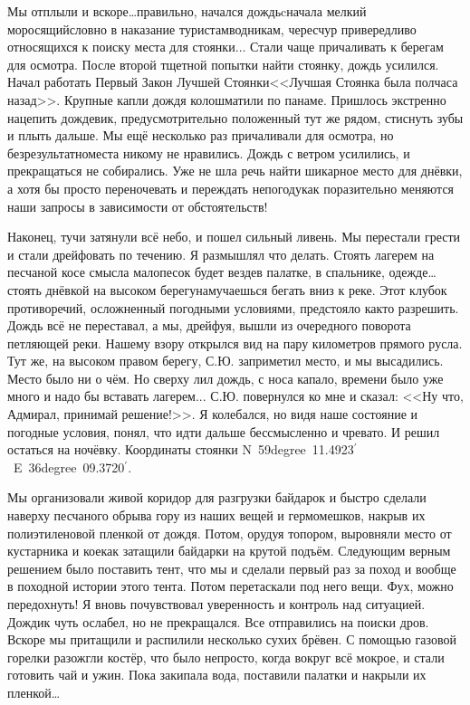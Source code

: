 Мы отплыли и вскоре\ldots  правильно, начался дождь\mdash cначала мелкий моросящий\mdash словно в наказание туристам\sdash водникам, чересчур привередливо относящихся к поиску места для стоянки$\ldots$ Стали чаще причаливать к берегам для осмотра. После второй тщетной попытки найти стоянку, дождь усилился. Начал работать Первый Закон Лучшей Стоянки\mdash <<Лучшая Стоянка была полчаса назад>>. Крупные капли дождя колошматили по панаме. Пришлось экстренно нацепить дождевик, предусмотрительно положенный тут же рядом, стиснуть зубы и плыть дальше. Мы ещё несколько раз причаливали для осмотра, но безрезультатно\mdash места никому не нравились. Дождь с ветром усилились, и прекращаться не собирались. Уже не шла речь найти шикарное место для днёвки, а хотя бы просто переночевать и переждать непогоду\mdash как поразительно меняются наши запросы в зависимости от обстоятельств!

Наконец, тучи затянули всё небо, и пошел сильный ливень. Мы перестали грести и стали дрейфовать по течению. Я размышлял что делать. Стоять лагерем на песчаной косе смысла мало\mdash песок будет везде\mdash в палатке, в спальнике, одежде\ldots  стоять днёвкой на высоком берегу\mdash намучаешься бегать вниз к реке. Этот клубок противоречий, осложненный погодными условиями, предстояло как\sdash то разрешить. Дождь всё не переставал, а мы, дрейфуя, вышли из очередного поворота петляющей реки. Нашему взору открылся вид на пару километров прямого русла. Тут же, на высоком правом берегу, С.Ю. заприметил место, и мы высадились. Место было ни о чём. Но сверху лил дождь, с носа капало, времени было уже много и надо бы вставать лагерем... С.Ю. повернулся ко мне и сказал: <<Ну что, Адмирал, принимай решение!>>. Я колебался, но видя наше состояние и погодные условия, понял, что идти дальше бессмысленно и чревато. И решил остаться на ночёвку. Координаты стоянки N~59degree~11.4923$^\prime$~E~36degree~09.3720$^\prime$.

Мы организовали живой коридор для разгрузки байдарок и быстро сделали наверху песчаного обрыва гору из наших вещей и гермомешков, накрыв их полиэтиленовой пленкой от дождя. Потом, орудуя топором, выровняли место от кустарника и кое\sdash как затащили байдарки на крутой подъём. Следующим верным решением было поставить тент, что мы и сделали первый раз за поход и вообще в походной истории этого тента. Потом перетаскали под него вещи. Фух, можно передохнуть! Я вновь почувствовал уверенность и контроль над ситуацией. Дождик чуть ослабел, но не прекращался. Все отправились на поиски дров. Вскоре мы притащили и распилили несколько сухих брёвен. С помощью газовой горелки разожгли костёр, что было непросто, когда вокруг всё мокрое, и стали готовить чай и ужин. Пока закипала вода, поставили палатки и накрыли их пленкой\ldots  

